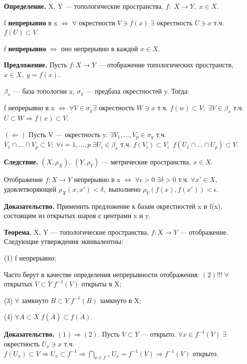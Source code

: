 \documentclass[12pt,a4paper]{article}
\begin{document}
\textbf{Определение.} X, Y --- топологические пространства, $f: \; X \to Y, \; x \in X.$ 

f \textbf{непрерывно} в x $\Leftrightarrow \; \forall$ окрестности $V \ni f(x) \; \exists$ окрестность $U \ni x$ т.ч. $f(U) \subset V.$ 

f \textbf{непрерывно} $\Leftrightarrow$ оно непрерывно в каждой $x \in X.$ 

\textbf{Предложение.} Пусть $f: X \to Y$ --- отображение топологических пространств, $x \in X, \; y = f(x).$ 

$\beta_{x}$ --- база топологии x, $\sigma_{y}$ --- предбаза окрестностей y. Тогда: 

f непрерывно в x $\Leftrightarrow \; \forall V \in \sigma_{y} \exists$ окрестность $W \ni x$ т.ч. $f(w) \subset V; \; \exists V \in \beta_{x}$ т.ч. $U \subset W \Rightarrow f(x) \subset V.$ 

$(\Leftarrow)$ Пусть V --- окрестность y. $\exists V_{1}, ..., V_{p} \in \sigma_{y}$ т.ч. $V_{1} \cap ... \cap V_{p} \subset V; \; \forall i = 1, ..., p \; \exists U_{i} \in \beta_{x}$ т.ч. $f(V_{i}) \subset V_{i} \; \ f(U_{1} \cap ... \cap U_{p}) \subset V.$

\textbf{Следствие.} $(X, \rho_{X}), \; (Y, \rho_{Y})$ --- метрические пространства, $x \in X.$ 

Отображение $f: X \to Y$ непрерывно в x $\Leftrightarrow \; \forall \epsilon > 0 \; \exists \delta > 0$ т.ч. $\forall x' \in X,$ удовлетворяющей $\rho_{X}(x, x') < \delta,$ выполнено $\rho_{Y}(f(x), f(x')) < \epsilon.$ 

\textbf{Доказательство.} Применить предложение к базам окрестностей x и f(x), состоящим из открытых шаров с центрами x и y. 

\textbf{Теорема.} X, Y --- топологические пространства, $f: X \to Y$ --- отображение. Следующие утверждения эквивалентны: 

(1) f непрерывно; 

Часто берут в качестве определения непрерывности отображения: $(2)!!! \; \forall$ открытых $V \subset Y \; f^{-1}(V)$ открыты в X; 

(3) $\forall$ замкнуто $B \subset Y \; f^{-1}(B)$ замкнуто в X; 

(4) $\forall A \subset X \; f(\overline{A}) \subset \overline{f(A)}.$

\textbf{Доказательство.} $(1) \Rightarrow (2).$ Пусть $V \subset Y$ --- открыто. $\forall x \in f^{-1}(V) \; \exists$ окрестность $U_{x} \ni x$ т.ч. $f(U_{x}) \subset V \Rightarrow U_{x} \subset f^{-1} \Rightarrow \bigcap_{x \in f^{-1}}
U_{x} = f^{-1}(V) \Rightarrow f^{-1}(V)$ открыто. 
\end{document}
